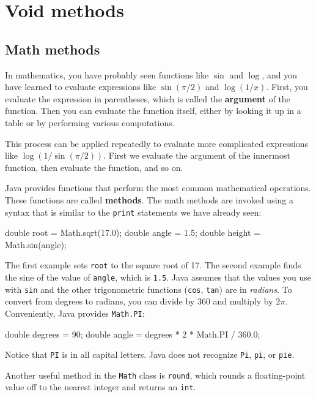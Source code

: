 \chapter{Void methods}
\label{chap03}

\section{Math methods}

In mathematics, you have probably seen functions like $\sin$ and
$\log$, and you have learned to evaluate expressions like
$\sin(\pi/2)$ and $\log(1/x)$.  First, you evaluate the
expression in parentheses, which is called the {\bf argument} of the
function.
Then you can evaluate the function itself, either by looking it up in
a table or by performing various computations.

This process can be applied repeatedly to evaluate more complicated
expressions like $\log(1/\sin(\pi/2))$.  First we evaluate the
argument of the innermost function, then evaluate the function,
and so on.

Java provides functions that perform the most
common mathematical operations.  These functions
are called {\bf methods}.
The math methods are invoked using a syntax that is similar to
the {\tt print} statements we have already seen:

\begin{code}
     double root = Math.sqrt(17.0);
     double angle = 1.5;
     double height = Math.sin(angle);
\end{code}
%
The first example sets {\tt root} to the square root of 17.
The second example finds the sine of the value of {\tt angle},
which is {\tt 1.5}.  Java assumes that the
values you use with {\tt sin} and the other trigonometric functions
({\tt cos}, {\tt tan}) are in {\em radians}.  To
convert from degrees to radians, you can divide by 360
and multiply by $2 \pi$.  Conveniently, Java provides {\tt Math.PI}:

\begin{code}
     double degrees = 90;
     double angle = degrees * 2 * Math.PI / 360.0;
\end{code}
%
Notice that {\tt PI} is in all capital letters.  Java does
not recognize {\tt Pi}, {\tt pi}, or {\tt pie}.

Another useful method in the {\tt Math} class is {\tt round},
which rounds a floating-point value off to the nearest integer
and returns an {\tt int}.

